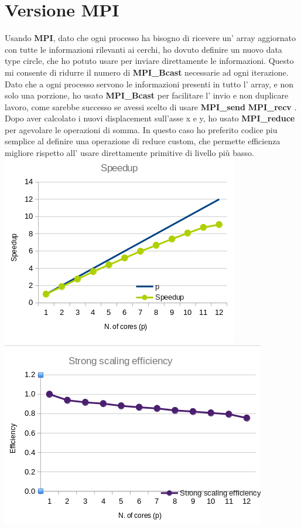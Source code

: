 \documentclass[a4paper,12pt, twoside]{report}
\begin{document}
\section*{Versione MPI}
Usando \textbf{MPI}\cite{mpi}, dato che ogni processo ha bisogno di ricevere un' array aggiornato con tutte le informazioni rilevanti ai cerchi, 
ho dovuto definire un nuovo data type circle, che ho potuto usare per inviare direttamente le informazioni. 
Questo mi consente di ridurre il numero di  \textbf{MPI\_Bcast} \cite{mpi_bcast} necessarie ad ogni iterazione. Dato che a ogni processo servono le
informazioni presenti in tutto l' array, e non solo una porzione, ho usato \textbf{MPI\_Bcast}\cite{mpi_bcast} per facilitare l' invio e non duplicare lavoro,
come sarebbe successo se avessi scelto di usare \textbf{MPI\_send} \cite{mpi_send} \textbf{MPI\_recv} \cite{mpi_recv}. 
Dopo aver calcolato i nuovi displacement sull'asse x e y, ho usato \textbf{MPI\_reduce} \cite{mpi_reduce} per agevolare le operazioni di somma.
In questo caso ho preferito codice piu semplice al definire una operazione di reduce custom,
che permette efficienza migliore rispetto all' usare direttamente primitive di livello più basso.
\newline
\includegraphics[scale=0.5]{images/mpi_speedup.png}
\includegraphics[scale=0.5]{images/mpi_strong.png}
\end{document}
